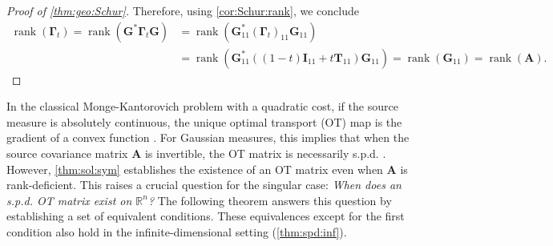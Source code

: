 \documentclass[noinfoline]{imsart}\setcounter{tocdepth}{2}
\renewcommand{\b}[1]{\mathbb{#1}} %
\newcommand{\m}[1]{\mathbf{#1}} %
\DeclareMathOperator*{\rk}{rank}
\theoremstyle{plain}
\begin{document}
\begin{proof}[Proof of \cref{thm:geo:Schur}]
Therefore, using \cref{cor:Schur:rank}, we conclude 
\begin{align*}
    \rk(\m{\Gamma}_{t}) = \rk (\m{G}^{*} \m{\Gamma}_{t} \m{G}) &= \rk (\m{G}_{11}^{*} (\m{\Gamma}_{t})_{11} \m{G}_{11}) \\
    &= \rk (\m{G}_{11}^{*} ((1-t) \m{I}_{11} + t \m{T}_{11}) \m{G}_{11}) =\rk (\m{G}_{11}) = \rk (\m{A}).
\end{align*}
\end{proof}

In the classical Monge-Kantorovich problem with a quadratic cost, if the source measure is absolutely continuous, the unique optimal transport (OT) map is the gradient of a convex function \cite{brenier1991polar, cuesta1989notes, ruschendorf1990characterization}. For Gaussian measures, this implies that when the source covariance matrix $\m{A}$ is invertible, the OT matrix is necessarily s.p.d. \cite{villani2021topics, panaretos2020invitation}. However, \cref{thm:sol:sym} establishes the existence of an OT matrix even when $\m{A}$ is rank-deficient. This raises a crucial question for the singular case: \emph{When does an s.p.d. OT matrix exist on $\b{R}^{n}$?}
The following theorem answers this question by establishing a set of equivalent conditions. These equivalences except for the first condition also hold in the infinite-dimensional setting (\cref{thm:spd:inf}).
\end{document}
